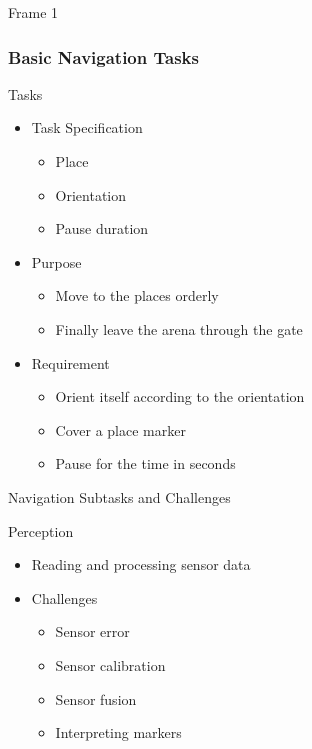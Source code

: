 \begin{frame}{Frame 1}

\frametitle {Basic Navigation Tasks}
\begin{block}{Tasks}
	\begin{itemize}
		\item Task Specification
		\begin{itemize}
		\item Place
		\item Orientation
		\item Pause duration
\end{itemize}		   
		\item Purpose
		\begin{itemize}
		 \item Move to the places orderly 
		 \item Finally leave the arena through the gate
\end{itemize}		
		\item Requirement
		\begin{itemize}
		 \item Orient itself according to the orientation
		 \item Cover a place marker
		 \item Pause for the time in seconds
\end{itemize}		
	\end{itemize}
\end{block}    
 
\end{frame}
\begin{frame}{Navigation Subtasks and Challenges}

\begin{block}{Perception}
	\begin{itemize}
		\item Reading and processing sensor data
		\item \alert {Challenges}
		\begin{itemize}
		\item Sensor error
		\item Sensor calibration
		\item Sensor fusion 
		\item Interpreting markers
\end{itemize}		  
	\end{itemize}
\end{block}
\end{frame}
